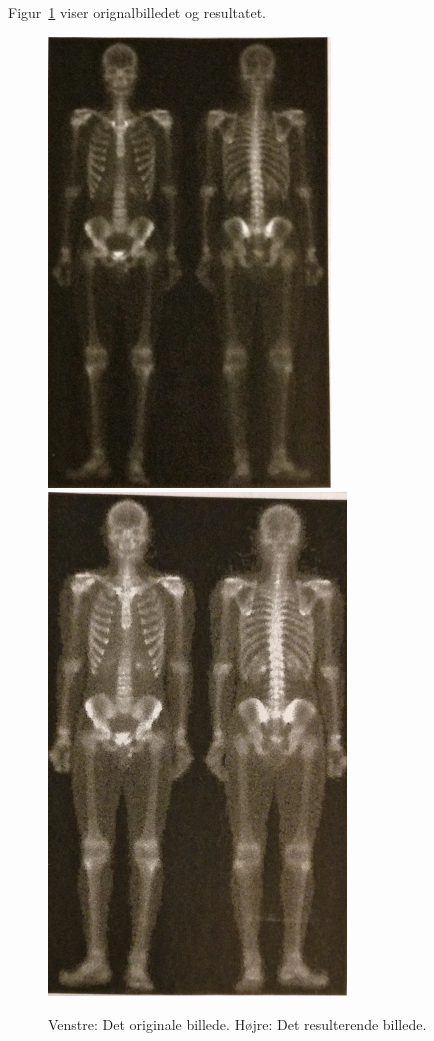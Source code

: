 Figur~\ref{fig:combined} viser orignalbilledet og resultatet.

\begin{figure}[H]
	\centering
	\includegraphics[width=0.4\linewidth]{figs/spm02/combinedfirst} \hfill
	\includegraphics[width=0.4\linewidth]{figs/spm02/combinedlast}	
	\caption{Venstre: Det originale billede. Højre: Det resulterende billede.}
	\label{fig:combined}
\end{figure}
